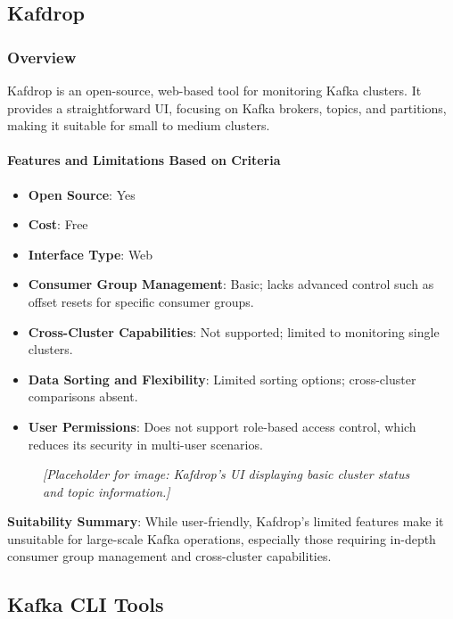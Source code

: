 \documentclass[10pt , a4paper]{report}
\begin{document}
\subsection{Kafdrop} 
\subsubsection*{Overview} 
Kafdrop is an open-source, web-based tool for monitoring Kafka clusters. It provides a straightforward UI, focusing on Kafka brokers, topics, and partitions, making it suitable for small to medium clusters.

\paragraph{Features and Limitations Based on Criteria}
\begin{itemize} 
    \item \small \textbf{Open Source}: Yes
    \item \small \textbf{Cost}: Free
    \item \small \textbf{Interface Type}: Web
    \item \small \textbf{Consumer Group Management}: Basic; lacks advanced control such as offset resets for specific consumer groups.
    \item \small \textbf{Cross-Cluster Capabilities}: Not supported; limited to monitoring single clusters.
    \item \small \textbf{Data Sorting and Flexibility}: Limited sorting options; cross-cluster comparisons absent.
    \item \small \textbf{User Permissions}: Does not support role-based access control, which reduces its security in multi-user scenarios.
\end{itemize}

\begin{figure}[h] 
\centering 
\textit{[Placeholder for image: Kafdrop’s UI displaying basic cluster status and topic information.]} 
\end{figure}

\textbf{Suitability Summary}: While user-friendly, Kafdrop’s limited features make it unsuitable for large-scale Kafka operations, especially those requiring in-depth consumer group management and cross-cluster capabilities.

\subsection{Kafka CLI Tools} 
\end{document}
